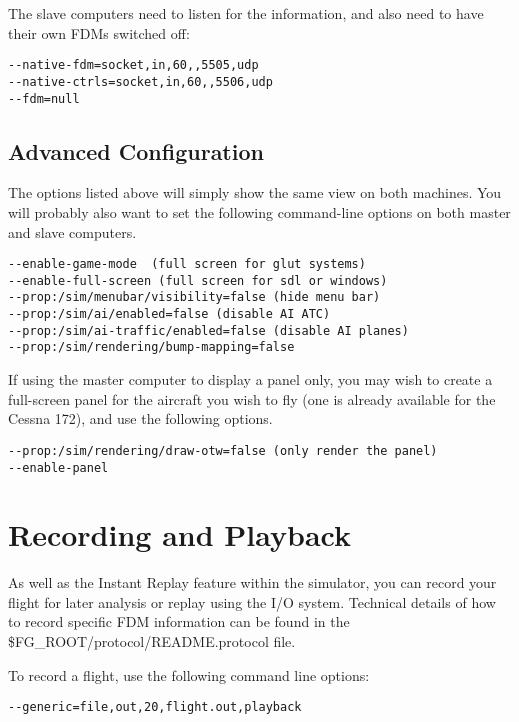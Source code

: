 The slave computers need to listen for the information, and also need to have
their own FDMs switched off:

\begin{verbatim}
--native-fdm=socket,in,60,,5505,udp
--native-ctrls=socket,in,60,,5506,udp
--fdm=null
\end{verbatim}

\subsection{Advanced Configuration}

The options listed above will simply show the same view on both machines. You will probably also want to set the
following command-line options on both master and slave computers.

\begin{verbatim}
--enable-game-mode  (full screen for glut systems)
--enable-full-screen (full screen for sdl or windows)
--prop:/sim/menubar/visibility=false (hide menu bar)
--prop:/sim/ai/enabled=false (disable AI ATC)
--prop:/sim/ai-traffic/enabled=false (disable AI planes)
--prop:/sim/rendering/bump-mapping=false
\end{verbatim}

If using the master computer to display a panel only, you may wish to create a full-screen panel for the
aircraft you wish to fly (one is already available for the Cessna 172), and use the following options.

\begin{verbatim}
--prop:/sim/rendering/draw-otw=false (only render the panel)
--enable-panel
\end{verbatim}

\section{Recording and Playback}

As well as the Instant Replay feature within the simulator, you can record your
flight for later analysis or replay using the I/O system.  Technical details of
how to record specific FDM information can be found in the
\$FG\_ROOT/protocol/README.protocol file.

To record a flight, use the following command line options:

\begin{verbatim}
--generic=file,out,20,flight.out,playback
\end{verbatim}

